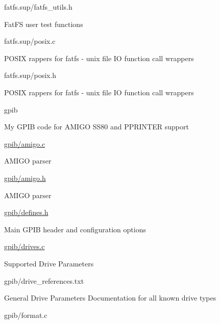 \begin{DoxyPre}
\begin{DoxyItemize}
\begin{DoxyItemize}
\item fatfs.sup/fatfs\_utils.h
\begin{DoxyItemize}
\item FatFS user test functions
\end{DoxyItemize}
\item fatfs.sup/posix.c
\begin{DoxyItemize}
\item POSIX rappers for fatfs - unix file IO function call wrappers
\end{DoxyItemize}
\item fatfs.sup/posix.h
\begin{DoxyItemize}
\item POSIX rappers for fatfs - unix file IO function call wrappers
\end{DoxyItemize}
\end{DoxyItemize}
\item gpib
\begin{DoxyItemize}
\item My GPIB code for AMIGO SS80 and PPRINTER support
\item \hyperlink{amigo_8c}{gpib/amigo.c}
\begin{DoxyItemize}
\item AMIGO parser
\end{DoxyItemize}
\item \hyperlink{amigo_8h}{gpib/amigo.h}
\begin{DoxyItemize}
\item AMIGO parser
\end{DoxyItemize}
\item \hyperlink{defines_8h}{gpib/defines.h}
\begin{DoxyItemize}
\item Main GPIB header and configuration options
\end{DoxyItemize}
\item \hyperlink{drives_8c}{gpib/drives.c}
\begin{DoxyItemize}
\item Supported Drive Parameters
\end{DoxyItemize}
\item gpib/drive\_references.txt
\begin{DoxyItemize}
\item General Drive Parameters Documentation for all known drive types
\end{DoxyItemize}
\item gpib/format.c
\begin{DoxyItemize}

\end{DoxyItemize}
\end{DoxyItemize}
\end{DoxyItemize}
\end{DoxyPre}
